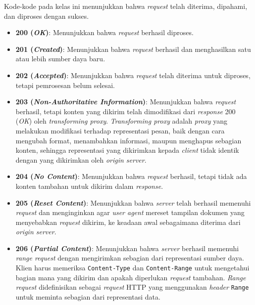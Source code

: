 Kode-kode pada kelas ini menunjukkan bahwa \textit{request} telah diterima, dipahami, dan diproses dengan sukses.

\begin{itemize}
    \item \textbf{200 (\textit{OK})}: Menunjukkan bahwa \textit{request} berhasil diproses.
  
    \item \textbf{201 (\textit{Created})}: Menunjukkan bahwa \textit{request} berhasil dan menghasilkan satu atau lebih sumber daya baru.
  
    \item \textbf{202 (\textit{Accepted})}: Menunjukkan bahwa \textit{request} telah diterima untuk diproses, tetapi pemrosesan belum selesai.
  
    \item \textbf{203 (\textit{Non-Authoritative Information})}: Menunjukkan bahwa \textit{request} berhasil, tetapi konten yang dikirim telah dimodifikasi dari \textit{response} 200 (\textit{OK}) oleh \textit{transforming proxy}. \textit{Transforming proxy} adalah \textit{proxy} yang melakukan modifikasi terhadap representasi pesan, baik dengan cara mengubah format, menambahkan informasi, maupun menghapus sebagian konten, sehingga representasi yang dikirimkan kepada \textit{client} tidak identik dengan yang dikirimkan oleh \textit{origin server}.
  
    \item \textbf{204 (\textit{No Content})}: Menunjukkan bahwa \textit{request} berhasil, tetapi tidak ada konten tambahan untuk dikirim dalam \textit{response}.
  
    \item \textbf{205 (\textit{Reset Content})}: Menunjukkan bahwa \textit{server} telah berhasil memenuhi \textit{request} dan menginginkan agar \textit{user agent} mereset tampilan dokumen yang menyebabkan \textit{request} dikirim, ke keadaan awal sebagaimana diterima dari \textit{origin server}.
  
    \item \textbf{206 (\textit{Partial Content})}: Menunjukkan bahwa \textit{server} berhasil memenuhi \textit{range request} dengan mengirimkan sebagian dari representasi sumber daya. Klien harus memeriksa \texttt{Content-Type} dan \texttt{Content-Range} untuk mengetahui bagian mana yang dikirim dan apakah diperlukan \textit{request} tambahan. \textit{Range request} didefinisikan sebagai \textit{request} HTTP yang menggunakan \textit{header} \texttt{Range} untuk meminta sebagian dari representasi data.
  

\end{itemize}
